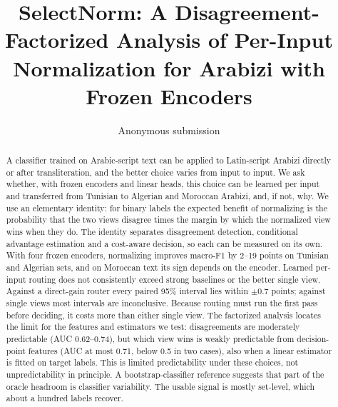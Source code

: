 \documentclass[11pt]{article}
\title{SelectNorm: A Disagreement-Factorized Analysis of Per-Input\\ Normalization for Arabizi with Frozen Encoders}
\author{Anonymous submission}
\begin{document}
\maketitle
\begin{abstract}
A classifier trained on Arabic-script text can be applied to Latin-script Arabizi directly or after transliteration, and the better choice varies from input to input. We ask whether, with frozen encoders and linear heads, this choice can be learned per input and transferred from Tunisian to Algerian and Moroccan Arabizi, and, if not, why. We use an elementary identity: for binary labels the expected benefit of normalizing is the probability that the two views disagree times the margin by which the normalized view wins when they do. The identity separates disagreement detection, conditional advantage estimation and a cost-aware decision, so each can be measured on its own. With four frozen encoders, normalizing improves macro-F1 by 2--19 points on Tunisian and Algerian sets, and on Moroccan text its sign depends on the encoder. Learned per-input routing does not consistently exceed strong baselines or the better single view. Against a direct-gain router every paired 95\% interval lies within $\pm0.7$ points; against single views most intervals are inconclusive. Because routing must run the first pass before deciding, it costs more than either single view. The factorized analysis locates the limit for the features and estimators we test: disagreements are moderately predictable (AUC 0.62--0.74), but which view wins is weakly predictable from decision-point features (AUC at most 0.71, below 0.5 in two cases), also when a linear estimator is fitted on target labels. This is limited predictability under these choices, not unpredictability in principle. A bootstrap-classifier reference suggests that part of the oracle headroom is classifier variability. The usable signal is mostly set-level, which about a hundred labels recover.
\end{abstract}












\appendix
\small

\end{document}
